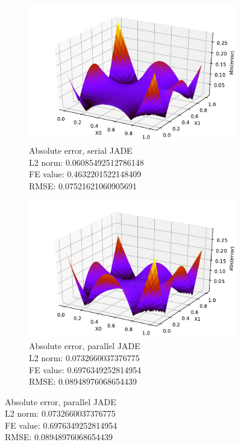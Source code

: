 \documentclass[./\jobname.tex]{subfiles}
\begin{document}
\begin{figure}[H]
	\centering
	\begin{subfigure}[b]{0.5\linewidth}
		\centering
		\includegraphics[width=1\textwidth]{../../code/experiments/experiment_1/abs_error_pde4_serial.pdf}
		\caption{Absolute error, serial JADE \\ L2 norm: 0.06085492512786148 \\ FE value: 0.4632201522148409 \\ RMSE: 0.07521621060905691}
		\label{fig:serial_JADE_pde4_abs_error}
	\end{subfigure}%
	\begin{subfigure}[b]{0.5\linewidth}
		\centering
		\includegraphics[width=1\textwidth]{../../code/experiments/experiment_1/abs_error_pde4_parallel.pdf}
		\caption{Absolute error, parallel JADE \\ L2 norm: 0.0732660037376775 \\ FE value: 0.6976349252814954 \\ RMSE: 0.08948976068654439}
		\label{fig:parallel_JADE_pde4_abs_error}
	\end{subfigure}%
	\label{fig:serial_parallel_pde4_error_comparison}
\end{figure}
\end{document}
